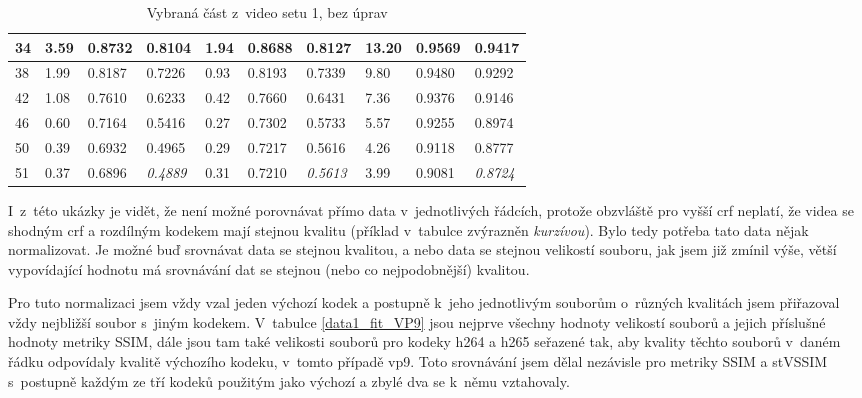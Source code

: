 \documentclass[thesis=M,czech]{FITthesis}[2016/06/26]
\begin{document}
\begin{table}[]
\begin{tabular}{|p{.3cm}|p{0.95cm}|p{0.95cm}|p{1.3cm}|p{0.95cm}|p{0.95cm}|p{1.3cm}|p{0.95cm}|p{0.95cm}|p{1.3cm}|}
34  & 3.59       & 0.8732 & 0.8104  & 1.94       & 0.8688 & 0.8127  & 13.20      & 0.9569 & 0.9417  \\ \hline
38  & 1.99       & 0.8187 & 0.7226  & 0.93       & 0.8193 & 0.7339  & 9.80       & 0.9480 & 0.9292  \\ \hline
42  & 1.08       & 0.7610 & 0.6233  & 0.42       & 0.7660 & 0.6431  & 7.36       & 0.9376 & 0.9146  \\ \hline
46  & 0.60       & 0.7164 & 0.5416  & 0.27       & 0.7302 & 0.5733  & 5.57       & 0.9255 & 0.8974  \\ \hline
50  & 0.39       & 0.6932 & 0.4965  & 0.29       & 0.7217 & 0.5616  & 4.26       & 0.9118 & 0.8777  \\ \hline
51  & 0.37       & 0.6896 & \textit{0.4889}  & 0.31       & 0.7210 & \textit{0.5613}  & 3.99       & 0.9081 & \textit{0.8724}  \\ \hline
\end{tabular}
\caption{Vybraná část z~video setu 1, bez úprav}
\label{data1_raw}
\end{table} 

I~z~této ukázky je vidět, že není možné porovnávat přímo data v~jednotlivých řádcích, protože obzvláště pro vyšší crf neplatí, že videa se shodným crf a rozdílným kodekem mají stejnou kvalitu (příklad v~tabulce zvýrazněn \textit{kurzívou}). Bylo tedy potřeba tato data nějak normalizovat. Je možné buď srovnávat data se stejnou kvalitou, a nebo data se stejnou velikostí souboru, jak jsem již zmínil výše, větší vypovídající hodnotu má srovnávání dat se stejnou (nebo co nejpodobnější) kvalitou. 

Pro tuto normalizaci jsem vždy vzal jeden výchozí kodek a postupně k~jeho jednotlivým souborům o~různých kvalitách jsem přiřazoval vždy nejbližší soubor s~jiným kodekem. V~tabulce \ref{data1_fit_VP9} jsou nejprve všechny hodnoty velikostí souborů a jejich příslušné hodnoty metriky SSIM, dále jsou tam také velikosti souborů pro kodeky h264 a h265 seřazené tak, aby kvality těchto souborů v~daném řádku odpovídaly kvalitě výchozího kodeku, v~tomto případě vp9. Toto srovnávání jsem dělal nezávisle pro metriky SSIM a stVSSIM s~postupně každým ze tří kodeků použitým jako výchozí a zbylé dva se k~němu vztahovaly.   
\end{document}
